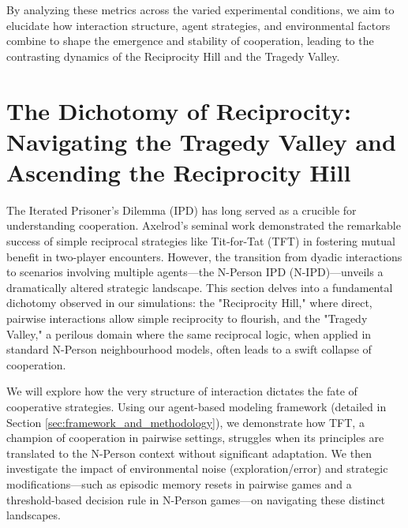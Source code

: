 \documentclass[]{llncs} %
\begin{document}
By analyzing these metrics across the varied experimental conditions, we aim to elucidate how interaction structure, agent strategies, and environmental factors combine to shape the emergence and stability of cooperation, leading to the contrasting dynamics of the Reciprocity Hill and the Tragedy Valley.


\section{The Dichotomy of Reciprocity: Navigating the Tragedy Valley and Ascending the Reciprocity Hill}
\label{sec:results_discussion_valley_hill} %

The Iterated Prisoner's Dilemma (IPD) has long served as a crucible for understanding cooperation. Axelrod's seminal work demonstrated the remarkable success of simple reciprocal strategies like Tit-for-Tat (TFT) in fostering mutual benefit in two-player encounters. However, the transition from dyadic interactions to scenarios involving multiple agents—the N-Person IPD (N-IPD)—unveils a dramatically altered strategic landscape. This section delves into a fundamental dichotomy observed in our simulations: the "Reciprocity Hill," where direct, pairwise interactions allow simple reciprocity to flourish, and the "Tragedy Valley," a perilous domain where the same reciprocal logic, when applied in standard N-Person neighbourhood models, often leads to a swift collapse of cooperation.

We will explore how the very structure of interaction dictates the fate of cooperative strategies. Using our agent-based modeling framework (detailed in Section \ref{sec:framework_and_methodology}), we demonstrate how TFT, a champion of cooperation in pairwise settings, struggles when its principles are translated to the N-Person context without significant adaptation. We then investigate the impact of environmental noise (exploration/error) and strategic modifications—such as episodic memory resets in pairwise games and a threshold-based decision rule in N-Person games—on navigating these distinct landscapes.
\end{document}
